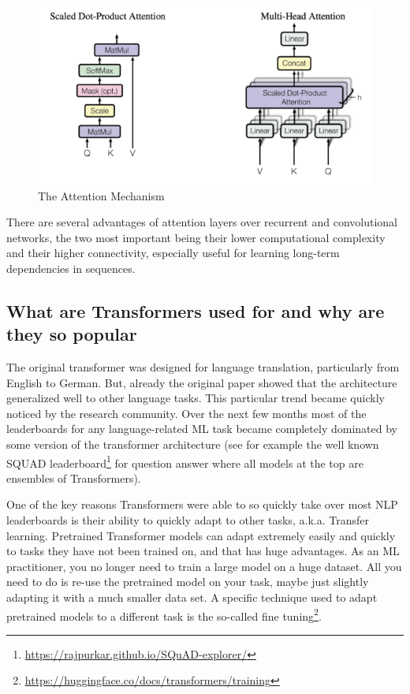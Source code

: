 \documentclass{article}
\begin{document}
\begin{figure}
    \centering
    \includegraphics[width=\textwidth,height=\textheight,keepaspectratio]{02-03.png}
    \caption{The Attention Mechanism}
    \label{fig:attention}
\end{figure}

There are several advantages of attention layers over recurrent and convolutional networks, the two most important being their lower computational complexity and their higher connectivity, especially useful for learning long-term dependencies in sequences.

\subsection{What are Transformers used for and why are they so popular}

The original transformer was designed for language translation, particularly from English to German. But, already the original paper showed that the architecture generalized well to other language tasks. This particular trend became quickly noticed by the research community. Over the next few months most of the leaderboards for any language-related ML task became completely dominated by some version of the transformer architecture (see for example the well known SQUAD leaderboard\footnote{\url{https://rajpurkar.github.io/SQuAD-explorer/}} for question answer where all models at the top are ensembles of Transformers).

One of the key reasons Transformers were able to so quickly take over most NLP leaderboards is their ability to quickly adapt to other tasks, a.k.a. Transfer learning. Pretrained Transformer models can adapt extremely easily and quickly to tasks they have not been trained on, and that has huge advantages. As an ML practitioner, you no longer need to train a large model on a huge dataset. All you need to do is re-use the pretrained model on your task, maybe just slightly adapting it with a much smaller data set. A specific technique used to adapt pretrained models to a different task is the so-called fine tuning\footnote{\url{https://huggingface.co/docs/transformers/training}}.
\end{document}

